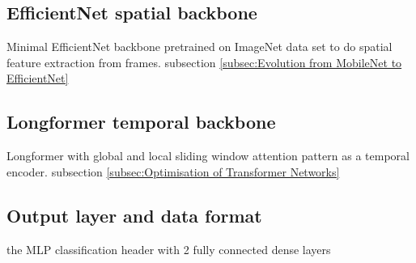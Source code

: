 \subsection{EfficientNet spatial backbone}
Minimal EfficientNet backbone pretrained on ImageNet data set to do spatial feature extraction from frames.
subsection \ref{subsec:Evolution from MobileNet to EfficientNet}

\subsection{Longformer temporal backbone}
Longformer with global and local sliding window attention pattern as a temporal encoder.
subsection \ref{subsec:Optimisation of Transformer Networks}

\subsection{Output layer and data format}
the MLP classification header with 2 fully connected dense layers

